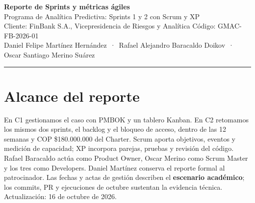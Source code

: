 \documentclass[10pt,a4paper]{article}
\begin{document}
\begin{center}
{\Large\bfseries Reporte de Sprints y métricas ágiles}\\[2pt]
Programa de Analítica Predictiva: Sprints 1 y 2 con Scrum y XP\\[2pt]
{\small Cliente: FinBank S.A., Vicepresidencia de Riesgos y Analítica \quad Código: GMAC-FB-2026-01}\\
{\small Daniel Felipe Martínez Hernández \,·\, Rafael Alejandro Baracaldo Doikov \,·\, Oscar Santiago Merino Suárez}
\end{center}
\vspace{-6pt}\rule{\linewidth}{0.4pt}

\section{Alcance del reporte}
En C1 gestionamos el caso con PMBOK y un tablero Kanban. En C2 retomamos los mismos dos sprints,
el backlog y el bloqueo de acceso, dentro de las 12 semanas y COP \$180.000.000 del Charter.
Scrum aporta objetivos, eventos y medición de capacidad; XP incorpora parejas, pruebas y revisión del código.
Rafael Baracaldo actúa como Product Owner, Oscar Merino como Scrum Master y los tres como Developers.
Daniel Martínez conserva el reporte formal al patrocinador.
Las fechas y actas de gestión describen el \textbf{escenario académico}; los commits, PR y ejecuciones
de octubre sustentan la evidencia técnica. Actualización: 16 de octubre de 2026.
\end{document}
